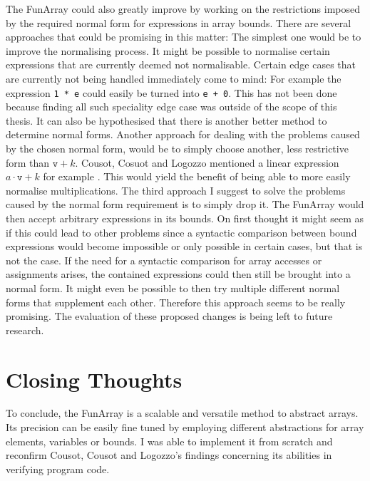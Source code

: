 The FunArray could also greatly improve by working on the restrictions imposed by the required normal form for expressions in array bounds. There are several approaches that could be promising in this matter: The simplest one would be to improve the normalising process. It might be possible to normalise certain expressions that are currently deemed not normalisable. Certain edge cases that are currently not being handled immediately come to mind: For example the expression \texttt{1 * e} could easily be turned into \texttt{e + 0}. This has not been done because finding all such speciality edge case was outside of the scope of this thesis. It can also be hypothesised that there is another better method to determine normal forms. Another approach for dealing with the problems caused by the chosen normal form, would be to simply choose another, less restrictive form than $\texttt{v}+k$. Cousot, Cosuot and Logozzo mentioned a linear expression $a\cdot\texttt{v}+k$ for example \cite{cousot2011}. This would yield the benefit of being able to more easily normalise multiplications. The third approach I suggest to solve the problems caused by the normal form requirement is to simply drop it. The FunArray would then accept arbitrary expressions in its bounds. On first thought it might seem as if this could lead to other problems since a syntactic comparison between bound expressions would become impossible or only possible in certain cases, but that is not the case. If the need for a syntactic comparison for array accesses or assignments arises, the contained expressions could then still be brought into a normal form. It might even be possible to then try multiple different normal forms that supplement each other. Therefore this approach seems to be really promising. The evaluation of these proposed changes is being left to future research.

\section{Closing Thoughts}

To conclude, the FunArray is a scalable and versatile method to abstract arrays. Its precision can be easily fine tuned by employing different abstractions for array elements, variables or bounds. I was able to implement it from scratch and reconfirm Cousot, Cousot and Logozzo's findings concerning its abilities in verifying program code.